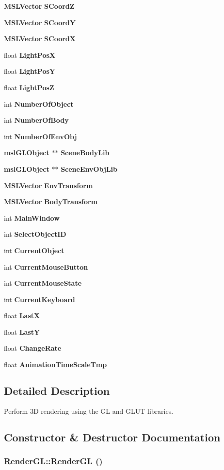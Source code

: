 \begin{CompactItemize}
{\bf MSLVector} {\bf SCoord\-Z}
\item 
{\bf MSLVector} {\bf SCoord\-Y}
\item 
{\bf MSLVector} {\bf SCoord\-X}
\item 
float {\bf Light\-Pos\-X}
\item 
float {\bf Light\-Pos\-Y}
\item 
float {\bf Light\-Pos\-Z}
\item 
int {\bf Number\-Of\-Object}
\item 
int {\bf Number\-Of\-Body}
\item 
int {\bf Number\-Of\-Env\-Obj}
\item 
{\bf msl\-GLObject} $\ast$$\ast$ {\bf Scene\-Body\-Lib}
\item 
{\bf msl\-GLObject} $\ast$$\ast$ {\bf Scene\-Env\-Obj\-Lib}
\item 
{\bf MSLVector} {\bf Env\-Transform}
\item 
{\bf MSLVector} {\bf Body\-Transform}
\item 
int {\bf Main\-Window}
\item 
int {\bf Select\-Object\-ID}
\item 
int {\bf Current\-Object}
\item 
int {\bf Current\-Mouse\-Button}
\item 
int {\bf Current\-Mouse\-State}
\item 
int {\bf Current\-Keyboard}
\item 
float {\bf Last\-X}
\item 
float {\bf Last\-Y}
\item 
float {\bf Change\-Rate}
\item 
float {\bf Animation\-Time\-Scale\-Tmp}
\end{CompactItemize}


\subsection{Detailed Description}
Perform 3D rendering using the GL and GLUT libraries.



\subsection{Constructor \& Destructor Documentation}
\subsubsection{\setlength{\rightskip}{0pt plus 5cm}Render\-GL::Render\-GL ()}\label{classRenderGL_a0}


